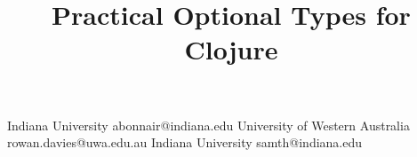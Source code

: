 \documentclass[preprint,9pt,twocolumn,nocopyrightspace,authoryear]{sigplanconf}
\begin{document}
\setlength{\pdfpageheight}{\paperheight}
\setlength{\pdfpagewidth}{\paperwidth}






\title{Practical Optional Types for Clojure}

           {Indiana University}
           {abonnair@indiana.edu}
           {University of Western Australia}
           {rowan.davies@uwa.edu.au}
           {Indiana University}
           {samth@indiana.edu}

\maketitle
\end{document}

